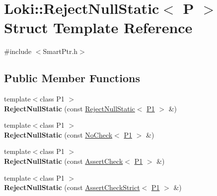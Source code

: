 \hypertarget{structLoki_1_1RejectNullStatic}{}\section{Loki\+:\+:Reject\+Null\+Static$<$ P $>$ Struct Template Reference}
\label{structLoki_1_1RejectNullStatic}


{\ttfamily \#include $<$Smart\+Ptr.\+h$>$}

\subsection*{Public Member Functions}
\begin{DoxyCompactItemize}
\item 
\hypertarget{structLoki_1_1RejectNullStatic_a996e21a50359477efbdfbd5583173c08}{}{\footnotesize template$<$class P1 $>$ }\\{\bfseries Reject\+Null\+Static} (const \hyperlink{structLoki_1_1RejectNullStatic}{Reject\+Null\+Static}$<$ \hyperlink{structP1}{P1} $>$ \&)\label{structLoki_1_1RejectNullStatic_a996e21a50359477efbdfbd5583173c08}

\item 
\hypertarget{structLoki_1_1RejectNullStatic_adc23478fd1bd001e82e118493d12ff23}{}{\footnotesize template$<$class P1 $>$ }\\{\bfseries Reject\+Null\+Static} (const \hyperlink{structLoki_1_1NoCheck}{No\+Check}$<$ \hyperlink{structP1}{P1} $>$ \&)\label{structLoki_1_1RejectNullStatic_adc23478fd1bd001e82e118493d12ff23}

\item 
\hypertarget{structLoki_1_1RejectNullStatic_aa4d6021c808422d45cc5d3236243a49d}{}{\footnotesize template$<$class P1 $>$ }\\{\bfseries Reject\+Null\+Static} (const \hyperlink{structLoki_1_1AssertCheck}{Assert\+Check}$<$ \hyperlink{structP1}{P1} $>$ \&)\label{structLoki_1_1RejectNullStatic_aa4d6021c808422d45cc5d3236243a49d}

\item 
\hypertarget{structLoki_1_1RejectNullStatic_a4ab5e092ebd9595390d0a2fbdfbda9f7}{}{\footnotesize template$<$class P1 $>$ }\\{\bfseries Reject\+Null\+Static} (const \hyperlink{structLoki_1_1AssertCheckStrict}{Assert\+Check\+Strict}$<$ \hyperlink{structP1}{P1} $>$ \&)\label{structLoki_1_1RejectNullStatic_a4ab5e092ebd9595390d0a2fbdfbda9f7}

\end{DoxyCompactItemize}
